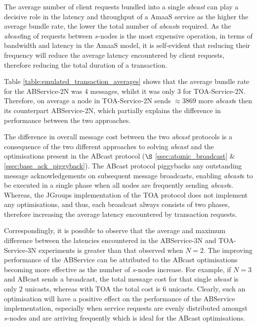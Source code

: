     The average number of client requests bundled into a single \emph{abcast} can play a decisive role in the latency and throughput of a \textsf{AmaaS} service as the higher the average bundle rate, the lower the total number of \emph{abcast}s required.  As the \emph{abcast}ing of requests between $s$-nodes is the most expensive operation, in terms of bandwidth and latency in the \textsf{AmaaS} model, it is self-evident that reducing their frequency will reduce the average latency encountered by client requests, therefore reducing the total duration of a transaction.  
    
    Table \ref{table:emulated_transaction_averages} shows that the average bundle rate for the ABService-2N was $4$ messages, whilst it was only $3$ for TOA-Service-2N.  Therefore, on average a node in TOA-Service-2N sends $\approx 3869$ more \emph{abcast}s then its counterpart ABService-2N, which partially explains the difference in performance between the two approaches.  
    
    The difference in overall message cost between the two \emph{abcast} protocols is a consequence of the two different approaches to solving \emph{abcast} and the optimisations present in the \textsf{ABcast} protocol ($\S$  \ref{ssec:atomic_broadcast} $\&$ \ref{ssec:base_ack_piggyback}).  The \textsf{ABcast} protocol piggybacks any outstanding message acknowledgements on subsequent message broadcasts, enabling \emph{abcast}s to be executed in a single phase when all nodes are frequently sending \emph{abcast}s.  Whereas, the JGroups implementation of the TOA protocol does not implement any optimisations, and thus, each broadcast always consists of two phases, therefore increasing the average latency encountered by transaction requests.  
	
	Correspondingly, it is possible to observe that the average and maximum difference between the latencies encountered in the ABService-3N and TOA-Service-3N experiments is greater than that observed when $N = 2$.  The improving performance of the ABService can be attributed to the \textsf{ABcast} optimisations becoming more effective as the number of $s$-nodes increase.  For example, if $N = 3$ and \textsf{ABcast} sends a broadcast, the total message cost for that single \emph{abcast} is only $2$ unicasts, whereas with TOA the total cost is $6$ unicasts.  Clearly, such an optimisation will have a positive effect on the performance of the ABService implementation, especially when service requests are evenly distributed amongst $s$-nodes and are arriving frequently which is ideal for the \textsf{ABcast} optimisations.  
	
